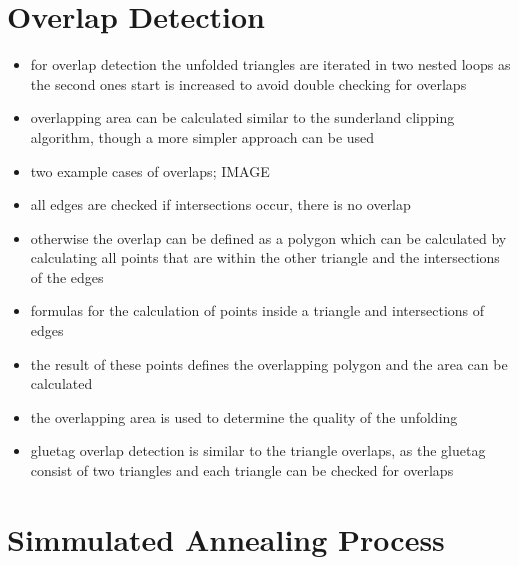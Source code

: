 \documentclass[draft,final]{vutinfth} %
\begin{document}
\section{Overlap Detection}

\begin{itemize}
	\item for overlap detection the unfolded triangles are iterated in two nested loops as the second ones start is increased to avoid double checking for overlaps
	\item overlapping area can be calculated similar to the sunderland clipping algorithm, though a more simpler approach can be used
	\item two example cases of overlaps; IMAGE
	\item all edges are checked if intersections occur, there is no overlap
	\item otherwise the overlap can be defined as a polygon which can be calculated by calculating all points that are within the other triangle and the intersections of the edges
	\item formulas for the calculation of points inside a triangle and intersections of edges
	\item the result of these points defines the overlapping polygon and the area can be calculated
	\item the overlapping area is used to determine the quality of the unfolding
	\item gluetag overlap detection is similar to the triangle overlaps, as the gluetag consist of two triangles and each triangle can be checked for overlaps
\end{itemize}

\section{Simmulated Annealing Process}
\end{document}
